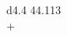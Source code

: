 \documentclass[border = 1mm]{standalone}
\begin{document}
    
\begin{tabular}{d{4.4}}
    44.113 \\
    + \\
     \\
    \hline\\
\end{tabular}
\end{document}
